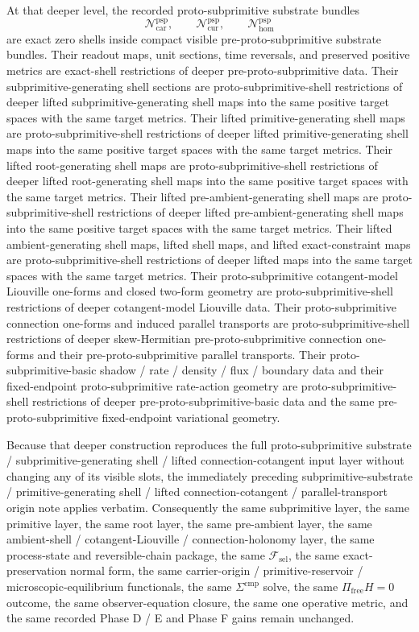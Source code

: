 \documentclass[11pt]{article}
\newcommand{\StemFunctional}{\mathscr F_{\mathrm{sel}}}
\newcommand{\Car}{\mathrm{car}}
\newcommand{\Cur}{\mathrm{cur}}
\newcommand{\Hom}{\mathrm{hom}}
\newcommand{\ProtoSubprimSpace}[1]{\mathcal N_{#1}^{\mathrm{psp}}}
\begin{document}
At that deeper level, the recorded proto-subprimitive substrate bundles
\[
\ProtoSubprimSpace{\Car},\qquad
\ProtoSubprimSpace{\Cur},\qquad
\ProtoSubprimSpace{\Hom}
\]
are exact zero shells inside compact visible pre-proto-subprimitive substrate bundles. Their readout maps, unit sections, time reversals, and preserved positive metrics are exact-shell restrictions of deeper pre-proto-subprimitive data. Their subprimitive-generating shell sections are proto-subprimitive-shell restrictions of deeper lifted subprimitive-generating shell maps into the same positive target spaces with the same target metrics. Their lifted primitive-generating shell maps are proto-subprimitive-shell restrictions of deeper lifted primitive-generating shell maps into the same positive target spaces with the same target metrics. Their lifted root-generating shell maps are proto-subprimitive-shell restrictions of deeper lifted root-generating shell maps into the same positive target spaces with the same target metrics. Their lifted pre-ambient-generating shell maps are proto-subprimitive-shell restrictions of deeper lifted pre-ambient-generating shell maps into the same positive target spaces with the same target metrics. Their lifted ambient-generating shell maps, lifted shell maps, and lifted exact-constraint maps are proto-subprimitive-shell restrictions of deeper lifted maps into the same target spaces with the same target metrics. Their proto-subprimitive cotangent-model Liouville one-forms and closed two-form geometry are proto-subprimitive-shell restrictions of deeper cotangent-model Liouville data. Their proto-subprimitive connection one-forms and induced parallel transports are proto-subprimitive-shell restrictions of deeper skew-Hermitian pre-proto-subprimitive connection one-forms and their pre-proto-subprimitive parallel transports. Their proto-subprimitive-basic shadow / rate / density / flux / boundary data and their fixed-endpoint proto-subprimitive rate-action geometry are proto-subprimitive-shell restrictions of deeper pre-proto-subprimitive-basic data and the same pre-proto-subprimitive fixed-endpoint variational geometry.

Because that deeper construction reproduces the full proto-subprimitive substrate / subprimitive-generating shell / lifted connection-cotangent input layer without changing any of its visible slots, the immediately preceding subprimitive-substrate / primitive-generating shell / lifted connection-cotangent / parallel-transport origin note applies verbatim. Consequently the same subprimitive layer, the same primitive layer, the same root layer, the same pre-ambient layer, the same ambient-shell / cotangent-Liouville / connection-holonomy layer, the same process-state and reversible-chain package, the same \(\StemFunctional\), the same exact-preservation normal form, the same carrier-origin / primitive-reservoir / microscopic-equilibrium functionals, the same \(\Sigma^{\mathrm{cmp}}\) solve, the same \(\Pi_{\mathrm{free}}H=0\) outcome, the same observer-equation closure, the same one operative metric, and the same recorded Phase D / E and Phase F gains remain unchanged.
\end{document}
